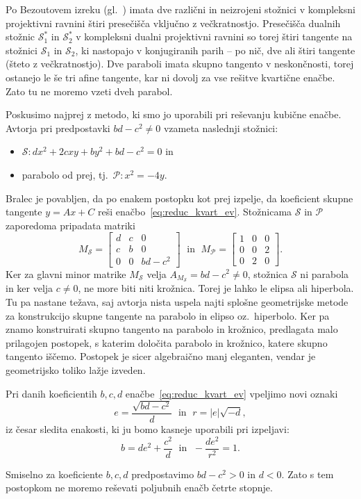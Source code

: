 Po Bezoutovem izreku (gl.\ \cite[izrek 2.4]{terglav2022}) imata dve različni in neizrojeni stožnici v kompleksni projektivni ravnini štiri presečišča vključno z večkratnostjo. Presečišča dualnih stožnic $\mathcal{S}^*_1$ in $\mathcal{S}^*_2$ v kompleksni dualni projektivni ravnini so torej štiri tangente na stožnici $\mathcal{S}_1$ in $\mathcal{S}_2$, ki nastopajo v konjugiranih parih -- po nič, dve ali štiri tangente (šteto z večkratnostjo). Dve paraboli imata skupno tangento v neskončnosti, torej ostanejo le še tri afine tangente, kar ni dovolj za vse rešitve kvartične enačbe. Zato tu ne moremo vzeti dveh parabol.

Poskusimo najprej z metodo, ki smo jo uporabili pri reševanju kubične enačbe. Avtorja pri predpostavki $bd - c^2 \neq 0$ vzameta naslednji stožnici:
\begin{itemize}
    \item $\mathcal{S}: dx^2 + 2cxy + by^2 + bd - c^2 = 0$ in
    \item parabolo od prej, tj.\ $\mathcal{P}: x^2 = -4y$.
\end{itemize}
Bralec je povabljen, da po enakem postopku kot prej izpelje, da koeficient skupne tangente $y = Ax + C$ reši enačbo~\eqref{eq:reduc_kvart_ev}. Stožnicama $\mathcal{S}$ in $\mathcal{P}$ zaporedoma pripadata matriki
$$ M_\mathcal{S} =
    \begin{bmatrix}
        d & c & 0\\
        c & b & 0\\
        0 & 0 & bd - c^2
    \end{bmatrix}
    \; \text{ in } \; M_\mathcal{P} =
    \begin{bmatrix}
        1 & 0 & 0\\
        0 & 0 & 2\\
        0 & 2 & 0
    \end{bmatrix}.
$$
Ker za glavni minor matrike $M_\mathcal{S}$ velja $A_{M_\mathcal{S}} = bd - c^2 \neq 0$, stožnica $\mathcal{S}$ ni parabola in ker velja $c \neq 0$, ne more biti niti krožnica. Torej je lahko le elipsa ali hiperbola. Tu pa nastane težava, saj avtorja nista uspela najti splošne geometrijske metode za konstrukcijo skupne tangente na parabolo in elipso oz.\ hiperbolo. Ker pa znamo konstruirati skupno tangento na parabolo in krožnico, predlagata malo prilagojen postopek, s katerim določita parabolo in krožnico, katere skupno tangento iščemo. Postopek je sicer algebraično manj eleganten, vendar je geometrijsko toliko lažje izveden.

Pri danih koeficientih $b, c, d$ enačbe~\eqref{eq:reduc_kvart_ev} vpeljimo novi oznaki
$$ e = \frac{\sqrt{bd - c^2}}{d} \; \text{ in } \; r = |e|\sqrt{-d}, $$
iz česar sledita enakosti, ki ju bomo kasneje uporabili pri izpeljavi:
\begin{equation}
    \label{eq:kvarticni_enakosti}
    b= de^2 + \frac{c^2}{d} \; \text{ in } \; -\frac{de^2}{r^2} = 1.
\end{equation}
\begin{opomba}
    Smiselno za koeficiente $b, c, d$ predpostavimo $bd - c^2 > 0$ in $d < 0$. Zato s tem postopkom ne moremo reševati poljubnih enačb četrte stopnje.
\end{opomba}

